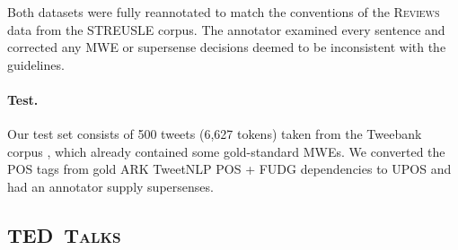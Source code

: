 \documentclass[11pt,letterpaper]{article}
\newcommand{\ensuretext}[1]{#1}
\newcommand{\nssmarker}{\ensuretext{\textcolor{magenta}{\ensuremath{^{\textsc{NS}}_{\textsc{S}}}}}}
\newcommand{\arkcomment}[3]{\ensuretext{\textcolor{#3}{[#1 #2]}}}
\newcommand{\nss}[1]{\arkcomment{\nssmarker}{#1}{magenta}}
\newcommand{\dataset}[1]{\mbox{\textsc{#1}}}	%
\newcommand{\finalversion}[1]{}
\begin{document}
Both datasets were fully reannotated to match the conventions of the \dataset{Reviews} data from the STREUSLE corpus. 
The annotator examined every sentence and corrected any MWE or supersense decisions deemed to be inconsistent with the guidelines.\finalversion{\nss{TODO: how many changes were made??}}


\paragraph{Test.}
Our test set consists of 500 tweets (6,627 tokens) taken from the Tweebank corpus \citep{kong-14}, 
which already contained some gold-standard MWEs. 
We converted the POS tags from gold ARK TweetNLP POS + FUDG dependencies to UPOS 
and had an annotator supply supersenses.


\subsection{\dataset{TED Talks}}
\end{document}
